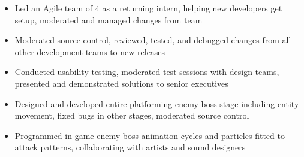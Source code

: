 \documentclass[10pt,a4paper,ragged2e,withhyper]{altacv}
\begin{document}
\begin{paracol}{2}
\divider

\begin{itemize}
    
    \item Led an Agile team of 4 as a returning intern, helping new developers get setup, moderated and managed changes from team
    
    \item Moderated source control, reviewed, tested, and debugged changes from all other development teams to new releases
    
    \item Conducted usability testing, moderated test sessions with design teams, presented and demonstrated solutions to senior executives
\end{itemize}

\divider




\begin{itemize}
\item Designed and developed entire platforming enemy boss stage including entity movement, fixed bugs in other stages, moderated source control

\item Programmed in-game enemy boss animation cycles and particles fitted to attack patterns, collaborating with artists and sound designers

\end{itemize}


\end{paracol}
\end{document}
